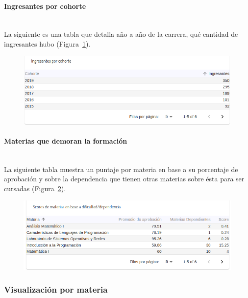 \paragraph{Ingresantes por cohorte} \mbox{}\\
La siguiente es una tabla que detalla año a año de la carrera, qué cantidad de ingresantes hubo  (Figura~\ref{fig:sa-ingresantes-cohorte}).

\begin{figure}[H]
  \centering
    \includegraphics[scale=0.4]{images/seguimiento-academico/sa-ingresantes-cohorte.png}
  \label{fig:sa-ingresantes-cohorte}
\end{figure}

\paragraph{Materias que demoran la formación} \mbox{}\\
La siguiente tabla muestra un puntaje por materia en base a su porcentaje de aprobación y sobre la dependencia que tienen otras materias sobre ésta para ser cursadas  (Figura~\ref{fig:sa-materias-traba}).

\begin{figure}[H]
  \centering
    \includegraphics[scale=0.4]{images/seguimiento-academico/sa-materias-traba.png}
  \label{fig:sa-materias-traba}
\end{figure}


\subsubsection{Visualización por materia}


